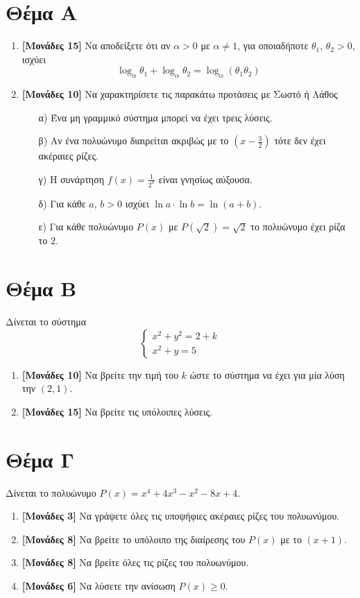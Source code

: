 \documentclass[12pt]{article}
\begin{document}
\section*{Θέμα Α}
  \noindent
  \begin{enumerate}
    \item \textbf{[Μονάδες 15]} Να αποδείξετε ότι αν $α>0$ με $α \ne 1$, για οποιαδήποτε $θ_1$, $θ_2>0$, ισχύει $$\log_α θ_1+\log_α θ_2=\log_α(θ_1 θ_2)$$
    \item \textbf{[Μονάδες 10]}  Να χαρακτηρίσετε τις παρακάτω προτάσεις με Σωστό ή Λάθος
    \begin{enumerate}
      \item [α)] Ένα μη γραμμικό σύστημα μπορεί να έχει τρεις λύσεις.
      \item [β)] Αν ένα πολυώνυμο διαιρείται ακριβώς με το $\left(x-\frac{3}{2}\right)$ τότε δεν έχει ακέραιες ρίζες.
      \item [γ)] Η συνάρτηση $f(x)=\frac{1}{2^x}$ είναι γνησίως αύξουσα.
      \item [δ)] Για κάθε $a$, $b>0$ ισχύει $\ln a \cdot \ln b = \ln(a+b)$.
      \item [ε)] Για κάθε πολυώνυμο $P(x)$ με $P(\sqrt{2})=\sqrt{2}$ το πολυώνυμο έχει ρίζα το $2$.
    \end{enumerate}
  \end{enumerate}

\section*{Θέμα Β}
  \noindent
  Δίνεται το σύστημα $$\begin{cases}x^2+y^2=2+k \\ x^2+y=5\end{cases}$$
  \begin{enumerate}
    \item \textbf{[Μονάδες 10]}  Να βρείτε την τιμή του $k$ ώστε το σύστημα να έχει για μία λύση την $(2,1)$.
    \item \textbf{[Μονάδες 15]}  Να βρείτε τις υπόλοιπες λύσεις.
  \end{enumerate}

\section*{Θέμα Γ}
  \noindent
  Δίνεται το πολυώνυμο $P(x)=x^4+4x^3-x^2-8x+4$.
  \begin{enumerate}
    \item \textbf{[Μονάδες 3]} Να γράψετε όλες τις υποψήφιες ακέραιες ρίζες του πολυωνύμου.
    \item \textbf{[Μονάδες 8]} Να βρείτε το υπόλοιπο της διαίρεσης του $P(x)$ με το $(x+1)$.
    \item \textbf{[Μονάδες 8]} Να βρείτε όλες τις ρίζες του πολυωνύμου.
    \item \textbf{[Μονάδες 6]} Να λύσετε την ανίσωση $P(x) \ge 0$.
  \end{enumerate}
\end{document}
